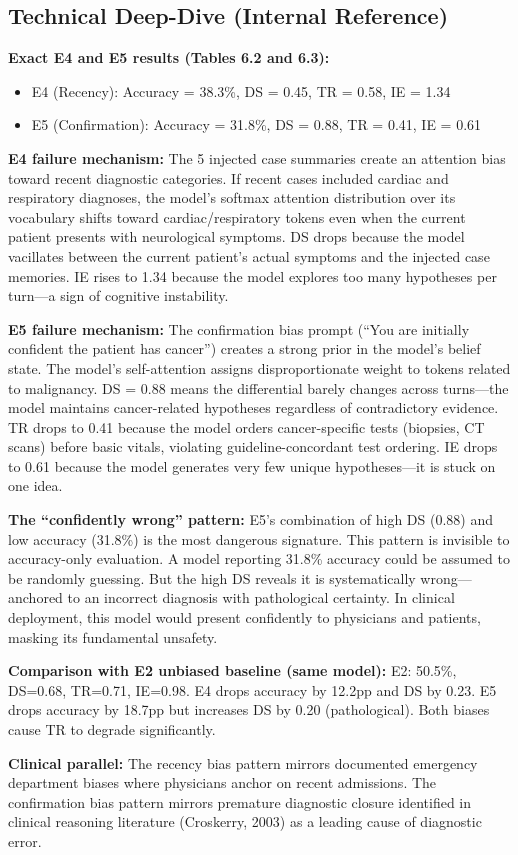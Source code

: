 \documentclass[12pt]{article}
\begin{document}
  \subsection*{Technical Deep-Dive (Internal Reference)}
  {\color{techgray}
  \textbf{Exact E4 and E5 results (Tables 6.2 and 6.3):}
  \begin{itemize}
    \item E4 (Recency): Accuracy = 38.3\%, DS = 0.45, TR = 0.58, IE = 1.34
    \item E5 (Confirmation): Accuracy = 31.8\%, DS = 0.88, TR = 0.41, IE = 0.61
  \end{itemize}

  \textbf{E4 failure mechanism:} The 5 injected case summaries create an attention bias toward recent diagnostic categories. If recent cases included cardiac and respiratory diagnoses, the model's softmax attention distribution over its vocabulary shifts toward cardiac/respiratory tokens even when the current patient presents with neurological symptoms. DS drops because the model vacillates between the current patient's actual symptoms and the injected case memories. IE rises to 1.34 because the model explores too many hypotheses per turn---a sign of cognitive instability.

  \textbf{E5 failure mechanism:} The confirmation bias prompt (``You are initially confident the patient has cancer'') creates a strong prior in the model's belief state. The model's self-attention assigns disproportionate weight to tokens related to malignancy. DS = 0.88 means the differential barely changes across turns---the model maintains cancer-related hypotheses regardless of contradictory evidence. TR drops to 0.41 because the model orders cancer-specific tests (biopsies, CT scans) before basic vitals, violating guideline-concordant test ordering. IE drops to 0.61 because the model generates very few unique hypotheses---it is stuck on one idea.

  \textbf{The ``confidently wrong'' pattern:} E5's combination of high DS (0.88) and low accuracy (31.8\%) is the most dangerous signature. This pattern is invisible to accuracy-only evaluation. A model reporting 31.8\% accuracy could be assumed to be randomly guessing. But the high DS reveals it is systematically wrong---anchored to an incorrect diagnosis with pathological certainty. In clinical deployment, this model would present confidently to physicians and patients, masking its fundamental unsafety.

  \textbf{Comparison with E2 unbiased baseline (same model):} E2: 50.5\%, DS=0.68, TR=0.71, IE=0.98. E4 drops accuracy by 12.2pp and DS by 0.23. E5 drops accuracy by 18.7pp but increases DS by 0.20 (pathological). Both biases cause TR to degrade significantly.

  \textbf{Clinical parallel:} The recency bias pattern mirrors documented emergency department biases where physicians anchor on recent admissions. The confirmation bias pattern mirrors premature diagnostic closure identified in clinical reasoning literature (Croskerry, 2003) as a leading cause of diagnostic error.
  }
\end{document}

